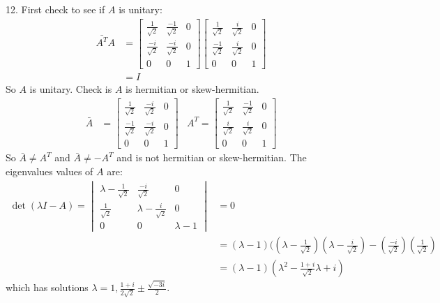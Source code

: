 \documentclass[11pt]{homework}
\begin{document}
12. First check to see if $A$ is unitary:
\begin{align*}
\bar{A^T}A &=
  \begin{bmatrix}
    \frac{1}{\sqrt{2}} & \frac{-1}{\sqrt{2}} & 0 \\
    \frac{-i}{\sqrt{2}} & \frac{-i}{\sqrt{2}} & 0 \\
    0 & 0 & 1
  \end{bmatrix}
  \begin{bmatrix}
    \frac{1}{\sqrt{2}} & \frac{i}{\sqrt{2}} & 0 \\
    \frac{-1}{\sqrt{2}} & \frac{i}{\sqrt{2}} & 0 \\
    0 & 0 & 1
  \end{bmatrix} \\
  &= I
\end{align*}
So $A$ is unitary.
Check is $A$ is hermitian or skew-hermitian.
\begin{align*}
\bar{A} &=
  \begin{bmatrix}
    \frac{1}{\sqrt{2}} & \frac{-i}{\sqrt{2}} & 0 \\
    \frac{-1}{\sqrt{2}} & \frac{-i}{\sqrt{2}} & 0 \\
    0 & 0 & 1
  \end{bmatrix}
&A^T =
  \begin{bmatrix}
    \frac{1}{\sqrt{2}} & \frac{-1}{\sqrt{2}} & 0 \\
    \frac{i}{\sqrt{2}} & \frac{i}{\sqrt{2}} & 0 \\
    0 & 0 & 1
  \end{bmatrix}
\end{align*}
So $\bar{A} \neq A^T$ and $\bar{A} \neq -A^T$
and is not hermitian or skew-hermitian.
The eigenvalues values of $A$ are:
\begin{align*}
\det(\lambda I - A) = 
  \begin{vmatrix}
  \lambda-\frac{1}{\sqrt{2}} & \frac{-i}{\sqrt{2}} & 0 \\
  \frac{1}{\sqrt{2}} & \lambda-\frac{i}{\sqrt{2}} & 0 \\
  0 & 0 & \lambda-1
  \end{vmatrix}
  &= 0\\
  &= (\lambda-1)((\lambda - \frac{1}{\sqrt{2}})(\lambda-\frac{i}{\sqrt{2}}) - (\frac{-i}{\sqrt{2}})(\frac{1}{\sqrt{2}}) \\
  &= (\lambda-1) (\lambda^2 - \frac{1+i}{\sqrt{2}}\lambda +i) 
\end{align*}
which has solutions $\lambda = 1, \frac{1+i}{2\sqrt{2}} \pm \frac{\sqrt{-3i}}{2}$.
\end{document}
